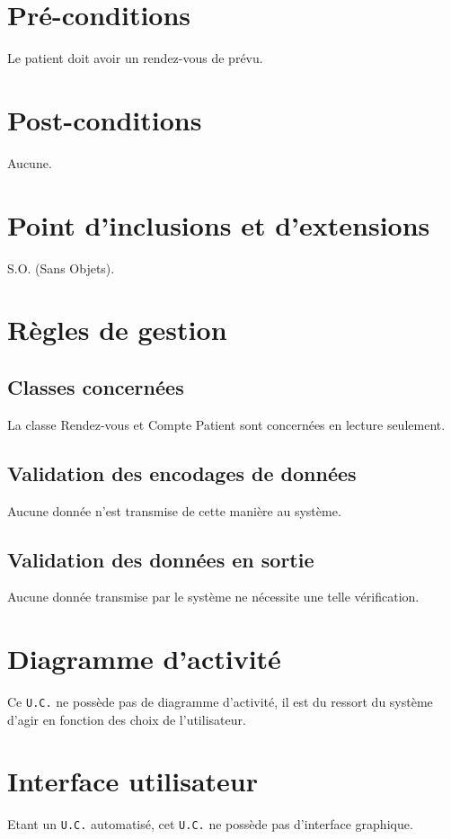\section{Pré-conditions}

Le patient doit avoir un rendez-vous de prévu.

\section{Post-conditions}

Aucune.

\section{Point d'inclusions et d'extensions}

S.O. (Sans Objets).
\section{Règles de gestion}

\subsection{Classes concernées}

La classe Rendez-vous et Compte Patient sont concernées en lecture seulement.

\subsection{Validation des encodages de données}

Aucune donnée n'est transmise de cette manière au système.

\subsection{Validation des données en sortie}

Aucune donnée transmise par le système ne nécessite une telle vérification.

\section{Diagramme d'activité}

Ce \texttt{U.C.} ne possède pas de diagramme d'activité, il est du ressort du système d'agir en fonction
des choix de l'utilisateur.

\section{Interface utilisateur}

Etant un \texttt{U.C.} automatisé, cet \texttt{U.C.} ne possède pas d'interface graphique.


